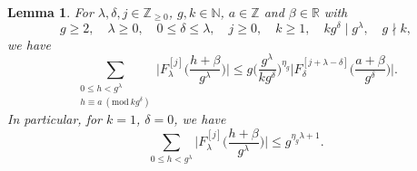 \documentclass[hidelinks]{amsart}
\numberwithin{equation}{section}
\theoremstyle{plain}
\newtheorem{lemma}{Lemma}
\theoremstyle{definition}
\renewcommand{\mod}[1]{(\mathrm{mod}\ #1)}
\begin{document}
\begin{lemma}
\label{lem:F_L1_moment}
For $\lambda,\delta,j\in\mathbb{Z}_{\ge0}$, $g,k\in\mathbb{N}$, $a\in\mathbb{Z}$ and $\beta\in\mathbb{R}$ with
\[
g\ge 2,\quad
\lambda\ge0,\quad
0\le\delta\le\lambda,\quad
j\ge 0,\quad
k\ge1,\quad
kg^{\delta}\mid g^{\lambda},\quad
g\nmid k,
\]
we have
\[
\sum_{\substack{
0\le h<g^{\lambda}\\
h\equiv a\ \mod{kg^{\delta}}
}}
\biggl|F_{\lambda}^{[j]}\biggl(\frac{h+\beta}{g^{\lambda}}\biggr)\biggr|
\le
g\biggl(\frac{g^{\lambda}}{kg^{\delta}}\biggr)^{\eta_{g}}
\biggl|F_{\delta}^{[j+\lambda-\delta]}\biggl(\frac{a+\beta}{g^{\delta}}\biggr)\biggr|.
\]
In particular, for $k=1$, $\delta=0$, we have
\begin{equation}
\label{lem:F_L1_moment:pure}
\sum_{0\le h<g^{\lambda}}
\biggl|F_{\lambda}^{[j]}\biggl(\frac{h+\beta}{g^{\lambda}}\biggr)\biggr|
\le
g^{\eta_{g}\lambda+1}.
\end{equation}
\end{lemma}
\end{document}
